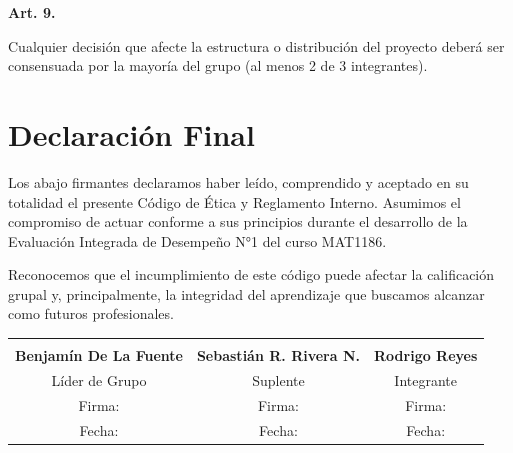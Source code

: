 \documentclass[12pt,a4paper]{article}
\newenvironment{articulo}[1]{%
  \begin{mdframed}[backgroundcolor=grisClaro,linecolor=azulUCT,linewidth=1.5pt,
    leftmargin=0pt,rightmargin=0pt,innerleftmargin=12pt,innerrightmargin=12pt,
    innertopmargin=8pt,innerbottommargin=8pt,roundcorner=4pt]
  \textbf{\textcolor{azulUCT}{Art. #1.}}\ %
}{\end{mdframed}\vspace{4pt}}
\begin{document}
\begin{articulo}{9}
Cualquier decisión que afecte la estructura o distribución del proyecto deberá ser consensuada por la mayoría del grupo (al menos 2 de 3 integrantes).
\end{articulo}

\section{Declaración Final}

Los abajo firmantes declaramos haber leído, comprendido y aceptado en su totalidad el presente Código de Ética y Reglamento Interno. Asumimos el compromiso de actuar conforme a sus principios durante el desarrollo de la Evaluación Integrada de Desempeño N°1 del curso MAT1186.

Reconocemos que el incumplimiento de este código puede afectar la calificación grupal y, principalmente, la integridad del aprendizaje que buscamos alcanzar como futuros profesionales.

\vspace{2.5cm}

\begin{center}
\renewcommand{\arraystretch}{2.5}
\begin{tabular}{ccc}
  \underline{\hspace{4.5cm}} & \underline{\hspace{4.5cm}} & \underline{\hspace{4.5cm}} \\[2pt]
  \textbf{Benjamín De La Fuente} & \textbf{Sebastián R. Rivera N.} & \textbf{Rodrigo Reyes} \\
  Líder de Grupo & Suplente & Integrante \\[20pt]
  Firma: \underline{\hspace{3cm}} & Firma: \underline{\hspace{3cm}} & Firma: \underline{\hspace{3cm}} \\[2pt]
  Fecha: \underline{\hspace{3cm}} & Fecha: \underline{\hspace{3cm}} & Fecha: \underline{\hspace{3cm}} \\
\end{tabular}
\end{center}
\end{document}
